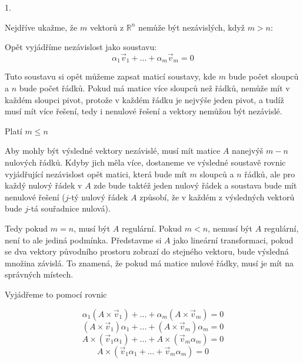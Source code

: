 \documentclass[10pt,a4paper]{article}
\begin{document}
1.

Nejdříve ukažme, že $m$ vektorů z $\mathbb{R}^n$ nemůže být nezávislých, když $m > n$:

Opět vyjádříme nezávislost jako soustavu:
\begin{equation*}
\alpha_1 \vec{v}_1 + ... + \alpha_m \vec{v}_m = 0
\end{equation*}

Tuto soustavu si opět můžeme zapsat maticí soustavy, kde $m$ bude počet sloupců a $n$ bude počet řádků. Pokud má matice více sloupců než řádků, nemůže mít v každém sloupci pivot, protože v každém řádku je nejvýše jeden pivot, a tudíž musí mít více řešení, tedy i nenulové řešení a vektory nemůžou být nezávislé.


\hfill 

Platí $m \leq n$  

\hfill

Aby mohly být výsledné vektory nezávislé, musí mít matice $A$ nanejvýš $m - n$ nulových řádků. Kdyby jich měla více, dostaneme ve výsledné soustavě rovnic vyjádřující nezávislost opět matici, která bude mít $m$ sloupců a $n$ řádků, ale pro každý nulový řádek v $A$ zde bude taktéž jeden nulový řádek a soustava bude mít nenulové řešení ($j$-tý nulový řádek $A$ způsobí, že v každém z výsledných vektorů bude $j$-tá souřadnice nulová).

\hfill

Tedy pokud $m = n$, musí být $A$ regulární. Pokud $m < n$, nemusí být $A$ regulární, není to ale jediná podmínka. Představme si $A$ jako lineární transformaci, pokud se dva vektory původního prostoru zobrazí do stejného vektoru, bude výsledná množina závislá. To znamená, že pokud má matice nulové řádky, musí je mít na správných místech.


\hfill
 
Vyjádřeme to pomocí rovnic

\begin{equation*}
\alpha_1 (A \times \vec{v}_1) + ... + \alpha_m (A \times \vec{v}_m) = 0
\end{equation*}
\begin{equation*}
 (A \times \vec{v}_1)\alpha_1 + ... +  (A \times \vec{v}_m)\alpha_m = 0
\end{equation*}
\begin{equation*}
 A \times (\vec{v}_1 \alpha_1) + ... +  A \times (\vec{v}_m \alpha_m) = 0
\end{equation*}
\begin{equation*}
 A \times (\vec{v}_1 \alpha_1 + ... + \vec{v}_m \alpha_m) = 0
\end{equation*}
\end{document}
